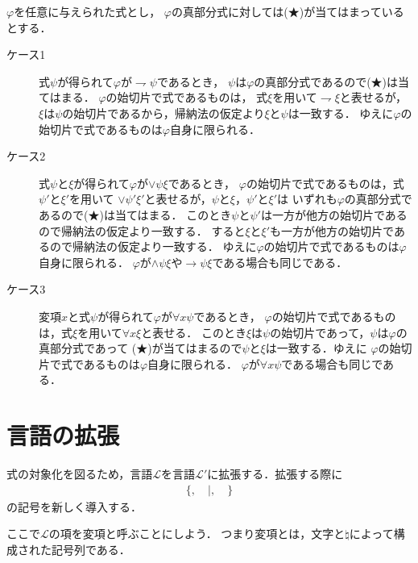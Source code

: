 \documentclass[a4j,10.5pt,oneside,openany]{jsbook}
\theoremstyle{mystyle}
\begin{document}
	$\varphi$を任意に与えられた式とし，
	$\varphi$の真部分式に対しては(★)が当てはまっているとする．
	\begin{description}
		\item[ケース1] 式$\psi$が得られて$\varphi$が$\rightharpoondown \psi$であるとき，
			$\psi$は$\varphi$の真部分式であるので(★)は当てはまる．
			$\varphi$の始切片で式であるものは，
			式$\xi$を用いて$\rightharpoondown \xi$と表せるが，
			$\xi$は$\psi$の始切片であるから，帰納法の仮定より$\xi$と$\psi$は一致する．
			ゆえに$\varphi$の始切片で式であるものは$\varphi$自身に限られる．
			
		\item[ケース2] 式$\psi$と$\xi$が得られて$\varphi$が$\vee \psi \xi$であるとき，
			$\varphi$の始切片で式であるものは，式$\psi'$と$\xi'$を用いて
			$\vee \psi' \xi'$と表せるが，$\psi$と$\xi$，$\psi'$と$\xi'$は
			いずれも$\varphi$の真部分式であるので(★)は当てはまる．
			このとき$\psi$と$\psi'$は一方が他方の始切片であるので帰納法の仮定より一致する．
			すると$\xi$と$\xi'$も一方が他方の始切片であるので帰納法の仮定より一致する．
			ゆえに$\varphi$の始切片で式であるものは$\varphi$自身に限られる．
			$\varphi$が$\wedge \psi \xi$や$\rightarrow \psi \xi$である場合も同じである．
			
		\item[ケース3] 変項$x$と式$\psi$が得られて$\varphi$が$\forall x \psi$であるとき，
			$\varphi$の始切片で式であるものは，式$\xi$を用いて$\forall x \xi$と表せる．
			このとき$\xi$は$\psi$の始切片であって，$\psi$は$\varphi$の真部分式であって
			(★)が当てはまるので$\psi$と$\xi$は一致する．ゆえに
			$\varphi$の始切片で式であるものは$\varphi$自身に限られる．
			$\varphi$が$\forall x \psi$である場合も同じである．
	\end{description}
	
\section{言語の拡張}
	式の対象化を図るため，言語$\mathcal{L}$を言語$\mathcal{L}'$に拡張する．拡張する際に
	\begin{align}
		\{, \quad |, \quad \}
	\end{align}
	の記号を新しく導入する．
	
	ここで$\mathcal{L}$の項を変項と呼ぶことにしよう．
	つまり変項とは，文字と$\natural$によって構成された記号列である．
	
\end{document}
